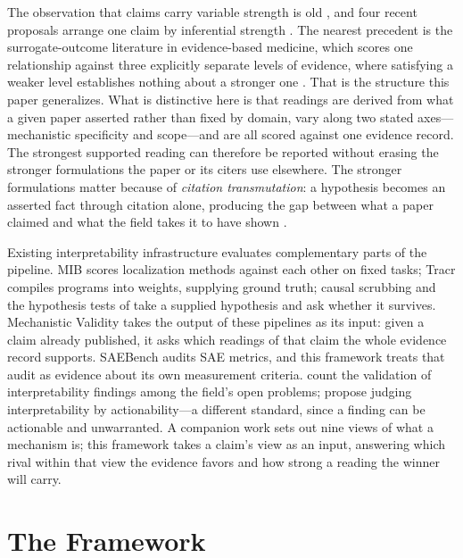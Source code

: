 \documentclass{article}
\begin{document}
The observation that claims carry variable strength is old \citep{toulmin1958uses}, and four recent proposals arrange one claim by inferential strength \citep{leavitt2020falsifiable, gupta2026anthropomorphic, salaudeen2025measurement, jacovi2020faithfully}. The nearest precedent is the surrogate-outcome literature in evidence-based medicine, which scores one relationship against three explicitly separate levels of evidence, where satisfying a weaker level establishes nothing about a stronger one \citep{euhta2024outcomes}. That is the structure this paper generalizes. What is distinctive here is that readings are derived from what a given paper asserted rather than fixed by domain, vary along two stated axes---mechanistic specificity and scope---and are all scored against one evidence record. The strongest supported reading can therefore be reported without erasing the stronger formulations the paper or its citers use elsewhere. The stronger formulations matter because of \emph{citation transmutation}: a hypothesis becomes an asserted fact through citation alone, producing the gap between what a paper claimed and what the field takes it to have shown \citep{greenberg2009citation}.

Existing interpretability infrastructure evaluates complementary parts of the pipeline. MIB \citep{mueller2025mib} scores localization methods against each other on fixed tasks; Tracr \citep{lindner2023interp} compiles programs into weights, supplying ground truth; causal scrubbing \citep{chan2022causal} and the hypothesis tests of \citet{shi2024hypothesis} take a supplied hypothesis and ask whether it survives. Mechanistic Validity takes the output of these pipelines as its input: given a claim already published, it asks which readings of that claim the whole evidence record supports. SAEBench \citep{karvonen2025saebench} audits SAE metrics, and this framework treats that audit as evidence about its own measurement criteria. \citet{sharkey2025open} count the validation of interpretability findings among the field's open problems; \citet{orgad2026actionable} propose judging interpretability by actionability---a different standard, since a finding can be actionable and unwarranted. A companion work \citep{tower2026mechviews} sets out nine views of what a mechanism is; this framework takes a claim's view as an input, answering which rival within that view the evidence favors and how strong a reading the winner will carry.

\section{The Framework}
\label{sec:framework}
\end{document}
